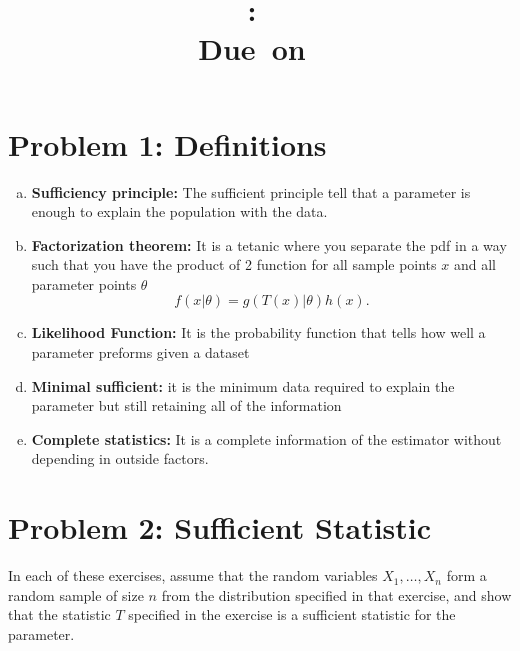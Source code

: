 \documentclass{article}
\title{
	\vspace{2in}
	\textmd{\textbf{\hmwkClass:\ \hmwkTitle}}\\
	\normalsize\vspace{0.1in}\small{Due\ on\ \hmwkDueDate}\\
	\vspace{0.1in}\large{\textit{\hmwkClassInstructor}}
	\vspace{3in}
}
\author{\hmwkAuthorName}
\date{}
\begin{document}
\maketitle
\pagebreak
\pagebreak

\section*{Problem 1: Definitions}

\begin{enumerate}[(a)]
	\item \textbf{Sufficiency principle:} The sufficient principle tell that a parameter is enough
	      to explain the population with the data.
	\item \textbf{Factorization theorem:} It is a tetanic where you separate the pdf in a way such that
	      you have the product of 2 function for all sample points $x$ and all parameter points $\theta$
	      $$
		      f(x|\theta) = g(T(x)|\theta)h(x).
	      $$
	\item \textbf{Likelihood Function:} It is the probability function that tells how well a parameter preforms given a dataset
	\item \textbf{Minimal sufficient:} it is the minimum data required to explain the parameter but still retaining all of the information
	\item \textbf{Complete statistics:} It is a complete information of the estimator without depending in outside factors.
\end{enumerate}

\section*{Problem 2: Sufficient Statistic}

In each of these exercises, assume that the random variables $X_1,\ldots,X_n$ form a random
sample of size $n$ from the distribution specified in that exercise, and show that the statistic
$T$ specified in the exercise is a sufficient statistic for the parameter.
\end{document}
